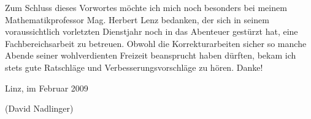 Zum Schluss dieses Vorwortes möchte ich mich noch besonders bei meinem Mathematikprofessor Mag. Herbert Lenz bedanken, der sich in seinem voraussichtlich vorletzten Dienstjahr noch in das Abenteuer gestürzt hat, eine Fachbereichsarbeit zu betreuen. Obwohl die Korrekturarbeiten sicher so manche Abende seiner wohlverdienten Freizeit beansprucht haben dürften, bekam ich stets gute Ratschläge und Verbesserungsvorschläge zu hören. Danke!

\vspace{0.8cm}
Linz, im Februar 2009

\vspace{0.6cm}
{\small(David Nadlinger)}